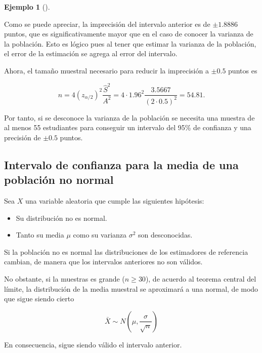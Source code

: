 \documentclass[
  spanish,
  a4paper,
]{scrreport}
\providecommand{\tightlist}{%
  \setlength{\itemsep}{0pt}\setlength{\parskip}{0pt}}
\theoremstyle{plain}
\theoremstyle{definition}
\newtheorem{example}{Ejemplo}[chapter]
\theoremstyle{definition}
\theoremstyle{remark}
\begin{document}
\begin{example}[]\protect\hypertarget{exm-tamaño-muestral-ntervalo-confianza-media-normal-varianza-desconocida}{}\label{exm-tamaño-muestral-ntervalo-confianza-media-normal-varianza-desconocida}

Como se puede apreciar, la imprecisión del intervalo anterior es de
\(\pm 1.8886\) puntos, que es significativamente mayor que en el caso de
conocer la varianza de la población. Esto es lógico pues al tener que
estimar la varianza de la población, el error de la estimación se agrega
al error del intervalo.

Ahora, el tamaño muestral necesario para reducir la imprecisión a
\(\pm 0.5\) puntos es

\[
n = 4 (z_{\alpha/2})^2\frac{\hat{S}^2}{A^2} = 4\cdot 1.96^2\frac{3.5667}{(2\cdot 0.5)^2} = 54.81.
\]

Por tanto, si se desconoce la varianza de la población se necesita una
muestra de al menos 55 estudiantes para conseguir un intervalo del 95\%
de confianza y una precisión de \(\pm 0.5\) puntos.

\end{example}

\subsection{Intervalo de confianza para la media de una población no
normal}\label{intervalo-de-confianza-para-la-media-de-una-poblaciuxf3n-no-normal}

Sea \(X\) una variable aleatoria que cumple las siguientes hipótesis:

\begin{itemize}
\tightlist
\item
  Su distribución no es normal.
\item
  Tanto su media \(\mu\) como su varianza \(\sigma^2\) son desconocidas.
\end{itemize}

Si la población no es normal las distribuciones de los estimadores de
referencia cambian, de manera que los intervalos anteriores no son
válidos.

No obstante, si la muestras es grande (\(n\geq 30\)), de acuerdo al
teorema central del límite, la distribución de la media muestral se
aproximará a una normal, de modo que sigue siendo cierto

\[
\bar X \sim N\left(\mu,\frac{\sigma}{\sqrt{n}}\right)
\]

En consecuencia, sigue siendo válido el intervalo anterior.
\end{document}

